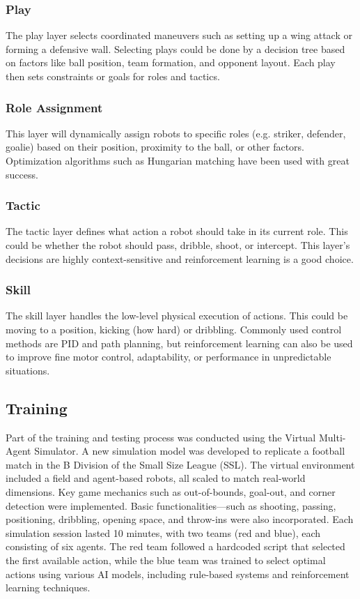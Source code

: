\subsubsection{Play}
The play layer selects coordinated maneuvers such as setting up a wing attack or forming a defensive wall. Selecting plays could be done by a decision tree based on factors like ball position, team formation, and opponent layout. Each play then sets constraints or goals for roles and tactics.

\subsubsection{Role Assignment}
This layer will dynamically assign robots to specific roles (e.g. striker, defender, goalie) based on their position, proximity to the ball, or other factors.
Optimization algorithms such as Hungarian matching have been used with great success.

\subsubsection{Tactic}
The tactic layer defines what action a robot should take in its current role.
This could be whether the robot should pass, dribble, shoot, or intercept.
This layer's decisions are highly context-sensitive and reinforcement learning is a good choice.

\subsubsection{Skill}
The skill layer handles the low-level physical execution of actions.
This could be moving to a position, kicking (how hard) or dribbling. Commonly used control methods are PID and path planning, but reinforcement learning can also be used to improve fine motor control, adaptability, or performance in unpredictable situations.

\subsection{Training}
Part of the training and testing process was conducted using the Virtual Multi-Agent Simulator. A new simulation model was developed to replicate a football match in the B Division of the Small Size League (SSL). The virtual environment included a field and agent-based robots, all scaled to match real-world dimensions. Key game mechanics such as out-of-bounds, goal-out, and corner detection were implemented. Basic functionalities—such as shooting, passing, positioning, dribbling, opening space, and throw-ins were also incorporated. Each simulation session lasted 10 minutes, with two teams (red and blue), each consisting of six agents. The red team followed a hardcoded script that selected the first available action, while the blue team was trained to select optimal actions using various AI models, including rule-based systems and reinforcement learning techniques.

